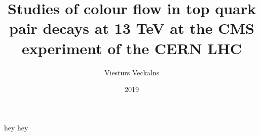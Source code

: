 \documentclass[titlepage, a4paper, EN]{mythesis}
\title{Studies of colour flow in top quark pair decays at 13 TeV at the CMS experiment of the CERN LHC}
\author{Viesturs Veckalns}
\date{2019}
\begin{document}
\maketitle
hey hey









\end{document}
